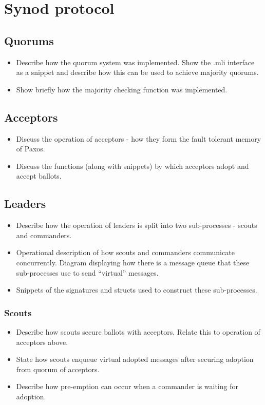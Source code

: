 \documentclass[12pt,twoside,notitlepage]{report}
\begin{document}
\section{Synod protocol}

\subsection{Quorums}
\begin{itemize}
  \item Describe how the quorum system was implemented. Show the .mli interface as a snippet and describe how this can be used to achieve majority quorums.
  \item Show briefly how the majority checking function was implemented.
\end{itemize}

\subsection{Acceptors}
\begin{itemize}
  \item Discuss the operation of acceptors - how they form the fault tolerant memory of Paxos.
  \item Discuss the functions (along with snippets) by which acceptors adopt and accept ballots.
\end{itemize}

\subsection{Leaders}
\begin{itemize}
  \item Describe how the operation of leaders is split into two sub-processes - scouts and commanders.
  \item Operational description of how scouts and commanders communicate concurrently. Diagram displaying how there is a message queue that these sub-processes use to send ``virtual'' messages.
  \item Snippets of the signatures and structs used to construct these sub-processes. 
\end{itemize}

\subsubsection{Scouts}
\begin{itemize}
  \item Describe how scouts secure ballots with acceptors. Relate this to operation of acceptors above.
  \item State how scouts enqueue virtual adopted messages after securing adoption from quorum of acceptors.
  \item Describe how pre-emption can occur when a commander is waiting for adoption.
\end{itemize}
\end{document}
